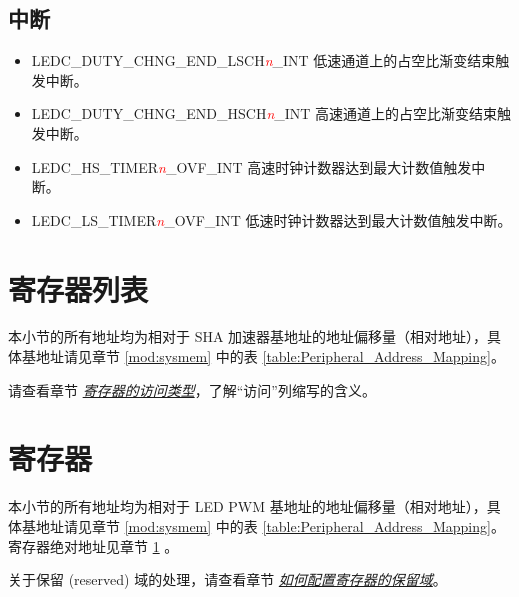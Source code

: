\documentclass[main\_\_CN.tex]{subfiles}
\begin{document}
\subsection{中断}
\begin{itemize}
\item \label{int:LEDCDUTYCHNGENDLSCHnINT}LEDC\_DUTY\_CHNG\_END\_LSCH\textcolor{red}{\it{n}}\_INT 低速通道上的占空比渐变结束触发中断。
\item \label{int:LEDCDUTYCHNGENDHSCHnINT}LEDC\_DUTY\_CHNG\_END\_HSCH\textcolor{red}{\it{n}}\_INT 高速通道上的占空比渐变结束触发中断。
\item \label{int:LEDCHSTIMERxOVFINT}LEDC\_HS\_TIMER\textcolor{red}{\it{n}}\_OVF\_INT 高速时钟计数器达到最大计数值触发中断。
\item \label{int:LEDCLSTIMERxOVFINT}LEDC\_LS\_TIMER\textcolor{red}{\it{n}}\_OVF\_INT 低速时钟计数器达到最大计数值触发中断。
\end{itemize}

\hypertarget{ledpwm-reg-summ}{}
\section{寄存器列表}\label{section:6.3}

本小节的所有地址均为相对于 SHA 加速器基地址的地址偏移量（相对地址），具体基地址请见章节 \ref{mod:sysmem} \textit{} 中的表 \ref{table:Peripheral_Address_Mapping}。

请查看章节 \hyperref[glossary-access-types]{\textit{寄存器的访问类型}}，了解“访问”列缩写的含义。


{\clearpage}

\section{寄存器}

本小节的所有地址均为相对于 LED PWM 基地址的地址偏移量（相对地址），具体基地址请见章节 \ref{mod:sysmem} \textit{} 中的表 \ref{table:Peripheral_Address_Mapping}。寄存器绝对地址见章节 \ref{section:6.3} \textit{}。

关于保留 (reserved) 域的处理，请查看章节 \hyperref[programming-reserved-field]{\textit{如何配置寄存器的保留域}}。


\end{document}
